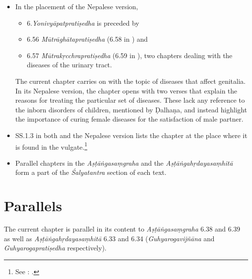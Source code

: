 \begin{itemize}
\begin{table}[t]
\begin{tabular}{lll}
           \bottomrule
       \end{tabular}
   \end{table}     
\item In the placement of the Nepalese version,
\begin{itemize}
    \item 6.\emph{Yonivyāpatpratiṣedha} is preceded by 
    \item 6.56 \emph{Mūtrāghātapratiṣedha} (6.58 in \cite{vulgate}) and 
    \item 6.57 \emph{Mūtrakṛcchrapratiṣedha} (6.59 in \cite{vulgate}), two 
    chapters
    dealing with the diseases of the urinary tract.  
    \end{itemize}
The current chapter carries on with the topic of diseases that affect
genitalia. In its Nepalese version, the chapter opens with two verses
that explain the reasons for treating the particular set of diseases.
These lack any reference to the inborn disorders of children, mentioned
by Ḍalhaṇa, and instead highlight the importance of curing female
diseases for the satisfaction of male partner.
        
\item SS.1.3 in both \cite{vulgate} and the Nepalese version lists the
chapter at the place where it is found in the vulgate.\footnote{See 
:
.}
        
        \item Parallel chapters in the \emph{Aṣṭāṅgasaṃgraha} and the
        \emph{Aṣṭāṅgahṛdayasaṃhitā} form a part of the \emph{Śalyatantra} section of 
        each
        text.
    \end{itemize} 
    
    \section{Parallels}
    
The current chapter is parallel in its content to \emph{Aṣṭāṅgasaṃgraha}
6.38 and 6.39 as well as \emph{Aṣṭāṅgahṛdayasaṃhitā} 6.33 and 6.34
(\emph{Guhyarogavijñāna} and \emph{Guhyarogapratiṣedha} respectively).%
    
